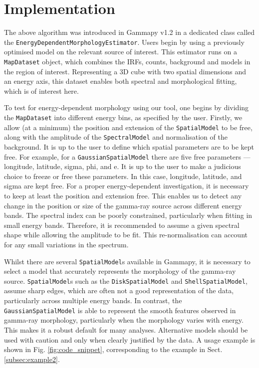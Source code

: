\documentclass{aa}
\newcommand{\code}[1]{\texttt{#1}}
\begin{document}
\section{Implementation}
\label{sec:description}
The above algorithm was introduced in Gammapy v1.2 \citep{gammapy_ref, gammapy_zenodo_12} in a dedicated class called the \code{EnergyDependentMorphologyEstimator}. Users begin by using a previously optimised model on the relevant source of interest. This estimator runs on a \code{MapDataset} object, which combines the IRFs, counts, background and models in the region of interest.
Representing a 3D cube with two spatial dimensions and an energy axis, this dataset enables both spectral and morphological fitting, which is of interest here.

To test for energy-dependent morphology using our tool, one begins by dividing the \code{MapDataset} into different energy bins, as specified by the user. Firstly, we allow (at a minimum) the position and extension of the \code{SpatialModel} to be free, along with the amplitude of the \code{SpectralModel} and normalisation of the background. 
It is up to the user to define which spatial parameters are to be kept free. 
For example, for a \code{GaussianSpatialModel} there are five free parameters --- longitude, latitude, sigma, phi, and e. It is up to the user to make a judicious choice to freeze or free these parameters. In this case, longitude, latitude, and sigma are kept free.
For a proper energy-dependent investigation, it is necessary to keep at least the position and extension free. This enables us to detect any change in the position or size of the gamma-ray source across different energy bands. 
The spectral index can be poorly constrained, particularly when fitting in small energy bands. Therefore, it is recommended to assume a given spectral shape while allowing the amplitude to be fit. This re-normalisation can account for any small variations in the spectrum. 

Whilst there are several \code{SpatialModel}s available in Gammapy, it is necessary to select a model that accurately represents the morphology of the gamma-ray source. \code{SpatialModel}s such as the \code{DiskSpatialModel} and \code{ShellSpatialModel}, assume sharp edges, which are often not a good representation of the data, particularly across multiple energy bands. 
In contrast, the \code{GaussianSpatialModel} is able to represent the smooth features observed in gamma-ray morphology, particularly when the morphology varies with energy. This makes it a robust default for many analyses.
Alternative models should be used with caution and only when clearly justified by the data.
A usage example is shown in Fig. \ref{fig:code_snippet}, corresponding to the example in Sect. \ref{subsec:example2}.
\end{document}
